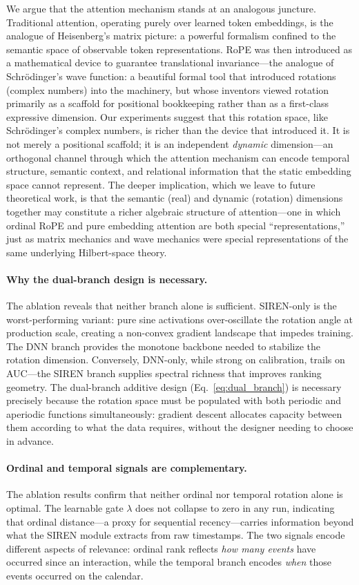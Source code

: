 \documentclass{article}
\begin{document}
We argue that the attention mechanism stands at an analogous juncture.
Traditional attention, operating purely over learned token embeddings, is the
analogue of Heisenberg's matrix picture: a powerful formalism confined to the
semantic space of observable token representations. RoPE was then introduced
as a mathematical device to guarantee translational invariance---the analogue
of Schr\"{o}dinger's wave function: a beautiful formal tool that introduced
rotations (complex numbers) into the machinery, but whose inventors viewed
rotation primarily as a scaffold for positional bookkeeping rather than as a
first-class expressive dimension. Our experiments suggest that this rotation
space, like Schr\"{o}dinger's complex numbers, is richer than the device that
introduced it. It is not merely a positional scaffold; it is an independent
\emph{dynamic} dimension---an orthogonal channel through which the attention
mechanism can encode temporal structure, semantic context, and relational
information that the static embedding space cannot represent. The deeper
implication, which we leave to future theoretical work, is that the semantic
(real) and dynamic (rotation) dimensions together may constitute a richer
algebraic structure of attention---one in which ordinal RoPE and pure
embedding attention are both special ``representations,'' just as matrix
mechanics and wave mechanics were special representations of the same
underlying Hilbert-space theory.

\paragraph{Why the dual-branch design is necessary.}
The ablation reveals that neither branch alone is sufficient. SIREN-only is
the worst-performing variant: pure sine activations over-oscillate the
rotation angle at production scale, creating a non-convex gradient landscape
that impedes training. The DNN branch provides the monotone backbone needed
to stabilize the rotation dimension. Conversely, DNN-only, while strong on
calibration, trails on AUC---the SIREN branch supplies spectral richness that
improves ranking geometry. The dual-branch additive design
(Eq.~\ref{eq:dual_branch}) is necessary precisely because the rotation space
must be populated with both periodic and aperiodic functions simultaneously:
gradient descent allocates capacity between them according to what the data
requires, without the designer needing to choose in advance.

\paragraph{Ordinal and temporal signals are complementary.}
The ablation results confirm that neither ordinal nor temporal rotation alone
is optimal. The learnable gate $\lambda$ does not collapse to zero in any
run, indicating that ordinal distance---a proxy for sequential
recency---carries information beyond what the SIREN module extracts from raw
timestamps. The two signals encode different aspects of relevance: ordinal
rank reflects \emph{how many events} have occurred since an interaction,
while the temporal branch encodes \emph{when} those events occurred on the
calendar.
\end{document}
